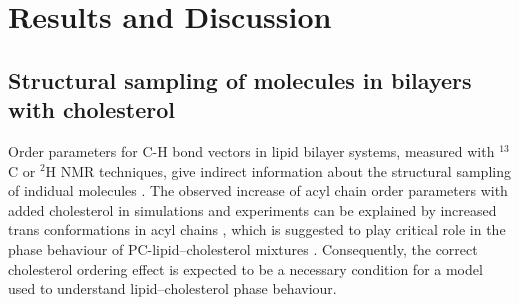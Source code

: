 \documentclass[aps,prl,superscriptaddress,twocolumn]{revtex4}
\begin{document}



\section{Results and Discussion}

\subsection{Structural sampling of molecules in bilayers with cholesterol}
Order parameters for C-H bond vectors in lipid bilayer systems, measured
with $^{13}$C or $^{2}$H NMR techniques, give indirect information about the structural
sampling of indidual molecules \cite{ollila16}. The observed increase of
acyl chain order parameters with added cholesterol in simulations and
experiments can be explained by increased trans conformations in acyl chains \cite{ferreira13,??},
which is suggested to play critical role in the phase behaviour of PC-lipid--cholesterol
mixtures \cite{ipsen87}. Consequently, the correct cholesterol ordering effect is
expected to be a necessary condition for a model used to understand lipid--cholesterol
phase behaviour.
\end{document}
